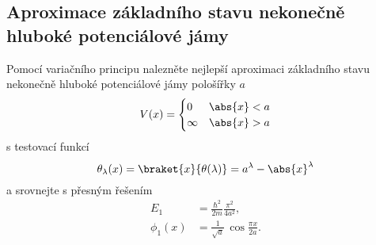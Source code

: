 \subsection[Nekonečně hluboká jáma]{Aproximace základního stavu nekonečně hluboké potenciálové jámy}
Pomocí variačního principu nalezněte nejlepší aproximaci základního stavu nekonečně hluboké potenciálové jámy pološířky $a$
\begin{equation}
    V(x)=
    \begin{cases}	
        0 & \abs{x}<a \\ \infty & \abs{x}>a
    \end{cases}
\end{equation}
s testovací funkcí
\begin{equation}
    \theta_{\lambda}(x)=\braket{x}{\theta(\lambda)}=a^{\lambda}-\abs{x}^{\lambda}
\end{equation}
a srovnejte s přesným řešením 
\begin{subequations}
    \begin{align}
        E_{1}&=\frac{\hbar^{2}}{2m}\frac{\pi^{2}}{4a^{2}},\\
        \phi_{1}(x)&=\frac{1}{\sqrt{a}}\,\cos{\frac{\pi x}{2a}}.
    \end{align}
\end{subequations}

